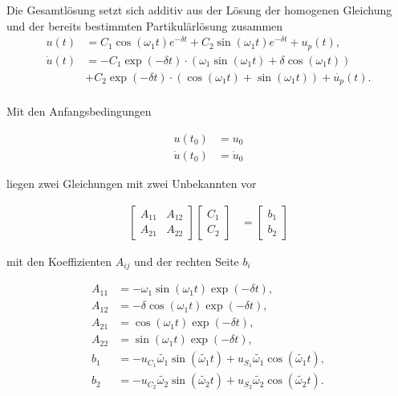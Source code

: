 \begin{solution}
    Die Gesamtlösung setzt sich additiv aus der Lösung der homogenen Gleichung und der bereits bestimmten Partikulärlösung zusammen
    \begin{align*}
        u(t) &= C_1\cos(\omega_1 t)e^{-\delta t} + C_2 \sin(\omega_1 t)e^{-\delta t} + u_p(t),\\
        \dot{u}(t) &= -C_1 \exp(-\delta t) \cdot (\omega_1 \sin(\omega_1 t) + \delta \cos(\omega_1 t)) \\ 
        &+ C_2 \exp(-\delta t) \cdot (\cos(\omega_1 t) + \sin(\omega_1 t)) + \dot{u_p}(t).\\
    \end{align*}

    Mit den Anfangsbedingungen

    \begin{align*}
        u(t_0) &= u_0 \\
        \dot{u}(t_0) &= \dot{u}_0
    \end{align*}

    liegen zwei Gleichungen mit zwei Unbekannten vor

    \begin{align*}
        \begin{bmatrix}
            A_{11} & A_{12}\\
            A_{21} & A_{22}
        \end{bmatrix}
        \begin{bmatrix}
            C_1 \\
            C_2
        \end{bmatrix}
        &=
        \begin{bmatrix}
        b_1 \\
        b_2
        \end{bmatrix} 
    \end{align*}

    mit den Koeffizienten $A_{ij}$ und der rechten Seite $b_i$

    \begin{align*}
        A_{11}&= -\omega_1 \sin(\omega_1 t) \exp(-\delta t),\\
        A_{12}&= - \delta \cos(\omega_1 t) \exp(-\delta t),\\
        A_{21}&= \cos(\omega_1 t) \exp(-\delta t),\\
        A_{22}&= \sin(\omega_1 t) \exp(-\delta t),\\
        b_{1}&= -u_{C_1} \tilde{\omega_1} \sin(\tilde{\omega_1}t) + u_{S_1} \tilde{\omega_1} \cos(\tilde{\omega_1}t),\\
        b_{2}&= -u_{C_2} \tilde{\omega_2} \sin(\tilde{\omega_2}t) + u_{S_2} \tilde{\omega_2} \cos(\tilde{\omega_2}t).
    \end{align*}


\end{solution}
